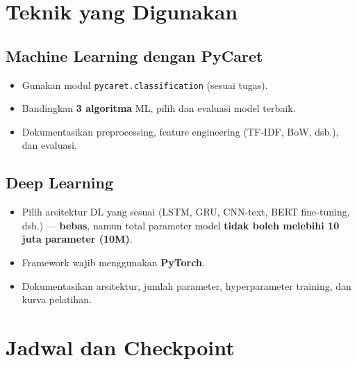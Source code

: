 \documentclass[11pt,a4paper]{article}
\begin{document}
\section{Teknik yang Digunakan}

\subsection{Machine Learning dengan PyCaret}
\begin{itemize}
  \item Gunakan modul \texttt{pycaret.classification} (sesuai tugas).
  \item Bandingkan \textbf{3 algoritma} ML, pilih dan evaluasi model terbaik.
  \item Dokumentasikan preprocessing, feature engineering (TF-IDF, BoW, dsb.), dan evaluasi.
\end{itemize}

\subsection{Deep Learning}
\begin{itemize}
  \item Pilih arsitektur DL yang sesuai (LSTM, GRU, CNN-text, BERT fine-tuning, dsb.) --- \textbf{bebas}, namun total parameter model \textbf{tidak boleh melebihi 10 juta parameter (10M)}.
  \item Framework wajib menggunakan \textbf{PyTorch}.
  \item Dokumentasikan arsitektur, jumlah parameter, hyperparameter training, dan kurva pelatihan.
\end{itemize}

\section{Jadwal dan Checkpoint}
\end{document}
